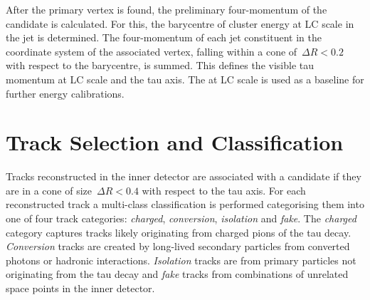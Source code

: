 After the primary vertex is found, the preliminary four-momentum of the
\tauhadvis candidate is calculated.
For this, the barycentre of cluster energy at LC scale in the jet is determined.
The four-momentum of each jet constituent in the coordinate system of the
associated vertex, falling within a cone of~$\Delta R < 0.2$ with respect to the
barycentre, is summed. This defines the visible tau momentum at LC scale and the
tau axis. The \tauhadvis \pt at LC scale is used as a baseline for further
energy calibrations.

\section{Track Selection and Classification}
\label{sec:reco_track_sel_classif}
%
Tracks reconstructed in the inner detector are associated with a \tauhadvis
candidate if they are in a cone of size~$\Delta R < 0.4$ with respect to the tau
axis.
%
%
%
For each reconstructed track a multi-class classification is performed
categorising them into one of four track categories: \emph{charged},
\emph{conversion}, \emph{isolation} and \emph{fake}. The \emph{charged} category
captures tracks likely originating from charged pions of the tau decay.
\emph{Conversion} tracks are created by long-lived secondary particles from
converted photons or hadronic interactions. \emph{Isolation} tracks are from
primary particles not originating from the tau decay and \emph{fake} tracks from
combinations of unrelated space points in the inner detector.

